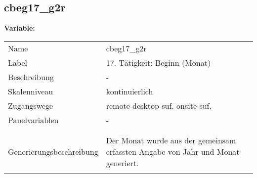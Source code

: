 	
	
	\subsection{cbeg17\_g2r}
	\label{subSection:cbeg17_g2r}

	\noindent\textbf{Variable:}\\
		\begin{tabular}{lL{11.3cm}}
			\label{tableVariable:cbeg17_g2r}
			Name & cbeg17\_g2r \\
			Label & 17. Tätigkeit: Beginn (Monat)  \\
			Beschreibung & - \\
			Skalenniveau & kontinuierlich \\
			Zugangswege &
				remote-desktop-suf,
				onsite-suf,
 \\
			Panelvariablen & -
			 \\
			 \\
 \\
					Generierungsbeschreibung & Der Monat wurde aus der gemeinsam erfassten Angabe von Jahr und Monat generiert. 
				 \\	
			 \\
		\end{tabular}





